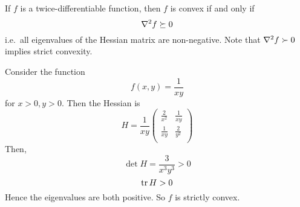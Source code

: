 \begin{theorem}
    If \( f \) is a twice-differentiable function, then \( f \) is convex if and only if
    \[ \laplacian{f} \succeq 0 \]
    i.e.\ all eigenvalues of the Hessian matrix are non-negative.
    Note that \( \laplacian{f} \succ 0 \) implies strict convexity.
\end{theorem}

\begin{example}
    Consider the function
    \[ f(x,y) = \frac{1}{xy} \]
    for \( x > 0, y > 0 \). Then the Hessian is
    \[ H = \frac{1}{xy}\begin{pmatrix}
        \frac{2}{x^2} & \frac{1}{xy} \\
        \frac{1}{xy} & \frac{2}{y^2} \\
    \end{pmatrix} \]
    Then,
    \[ \det H = \frac{3}{x^3 y^3} > 0 \]
    \[ \tr H > 0 \]
    Hence the eigenvalues are both positive.
    So \( f \) is strictly convex.
\end{example}


